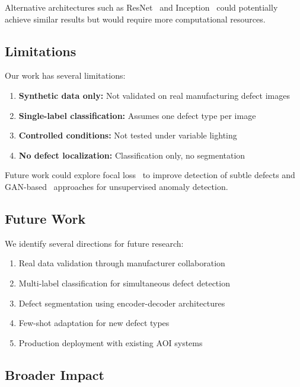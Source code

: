\documentclass[12pt,a4paper]{article}
\begin{document}
Alternative architectures such as ResNet~\cite{he2016deep} and 
Inception~\cite{szegedy2015going} could potentially achieve similar 
results but would require more computational resources.

\subsection{Limitations}

Our work has several limitations:

\begin{enumerate}
\item \textbf{Synthetic data only:} Not validated on real manufacturing 
    defect images
\item \textbf{Single-label classification:} Assumes one defect type per image
\item \textbf{Controlled conditions:} Not tested under variable lighting
\item \textbf{No defect localization:} Classification only, no segmentation
\end{enumerate}

Future work could explore focal loss~\cite{lin2017focal} to improve 
detection of subtle defects and GAN-based~\cite{goodfellow2014generative} 
approaches for unsupervised anomaly detection.

\subsection{Future Work}

We identify several directions for future research:

\begin{enumerate}
\item Real data validation through manufacturer collaboration
\item Multi-label classification for simultaneous defect detection
\item Defect segmentation using encoder-decoder architectures~\cite{ronneberger2015unet}
\item Few-shot adaptation for new defect types
\item Production deployment with existing AOI systems
\end{enumerate}

\subsection{Broader Impact}
\end{document}
